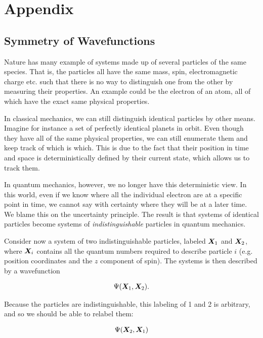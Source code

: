 \documentclass[Thesis.tex]{subfiles}
\begin{document}
\chapter{Appendix}

\section{Symmetry of Wavefunctions}

Nature has many example of systems made up of several particles of the same
species. That is, the particles all have the same mass, spin, electromagnetic
charge etc. such that there is no way to  distinguish one from the other by
measuring their properties. An example could be the electron of an atom, all of
which have the exact same physical properties.

In classical mechanics, we can still distinguish identical particles by other
means. Imagine for instance a set of perfectly identical planets in orbit. Even
though they have all of the same physical properties, we can still enumerate
them and keep track of which is which. This is due to the fact that their
position in time and space is deterministically defined by their current state,
which allows us to track them.

In quantum mechanics, however, we no longer have this deterministic view. In
this world, even if we know where all the individual electron are at a specific
point in time, we cannot say with certainty where they will be at a later
time. We blame this on the uncertainty principle. The result is that systems of
identical particles become systems of \emph{indistinguishable} particles in
quantum mechanics.

Consider now a system of two indistinguishable particles, labeled $\bm{X}_1$ and
$\bm{X}_2$, where $\bm{X}_i$ contains all the quantum numbers required to describe
particle $i$ (e.g. position coordinates and the $z$ component of spin). The
systems is then described by a wavefunction

\begin{align}
    \Psi(\bm{X}_1, \bm{X}_2).
\end{align}

Because the particles are indistinguishable, this labeling of 1 and 2 is
arbitrary, and so we should be able to relabel them:

\begin{align}
    \Psi(\bm{X}_2, \bm{X}_1)
\end{align}
\end{document}
